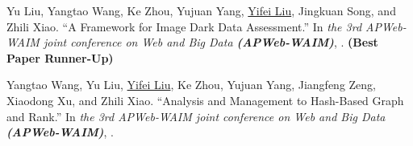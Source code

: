\documentclass[a4paper,10pt,oneside]{article}
\begin{document}
\begin{body}

\NumberedItem{[6]}
Yu Liu, Yangtao Wang, Ke Zhou, Yujuan Yang, \underline{Yifei Liu}, Jingkuan Song, and Zhili Xiao.
``A Framework for Image Dark Data Assessment.''
In \textit{the 3rd APWeb-WAIM joint conference on Web and Big Data \textbf{(APWeb-WAIM)}}, %
. \textbf{(Best Paper Runner-Up)}


\NumberedItem{[7]}
Yangtao Wang, Yu Liu, \underline{Yifei Liu}, Ke Zhou, Yujuan Yang, Jiangfeng Zeng, Xiaodong Xu, and Zhili Xiao.
``Analysis and Management to Hash-Based Graph and Rank.''
In \textit{the 3rd APWeb-WAIM joint conference on Web and Big Data \textbf{(APWeb-WAIM)}}, %
. 










\end{body}
\end{document}
